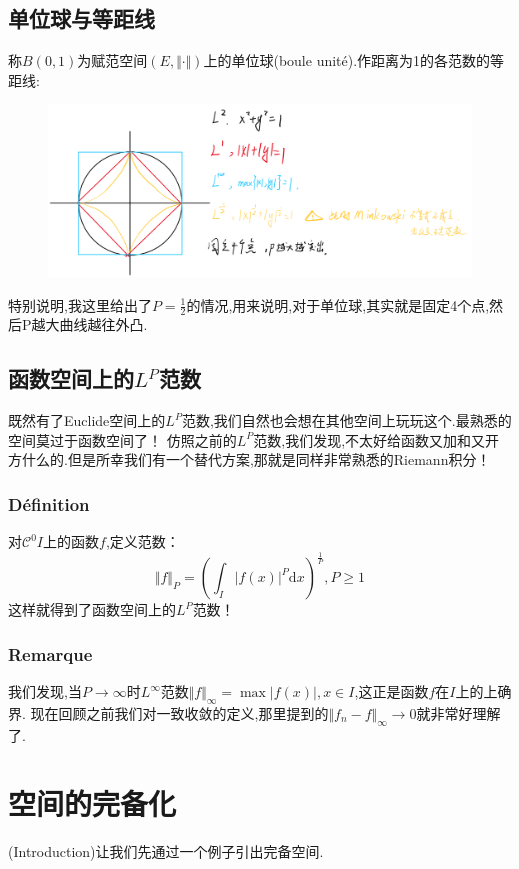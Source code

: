 \documentclass[12pt, a4paper, oneside]{ctexbook}
\newcommand{\C }{\mathcal{C}}%
\begin{document}
  \subsection{单位球与等距线}
  称$B(0,1)$为赋范空间$(E,\Vert \cdot \Vert)$上的单位球(boule unité).作距离为1的各范数的等距线:
  \begin{figure}[H]%
    \centering
    \includegraphics[scale=0.6]{danweiqiu.png}
    \label{fig:1}
  \end{figure}
  特别说明,我这里给出了$P=\frac{1}{2}$的情况,用来说明,对于单位球,其实就是固定4个点,然后P越大曲线越往外凸.
  \subsection{函数空间上的$L^P$范数}
  既然有了Euclide空间上的$L^P$范数,我们自然也会想在其他空间上玩玩这个.最熟悉的空间莫过于函数空间了！
  仿照之前的$L^P$范数,我们发现,不太好给函数又加和又开方什么的.但是所幸我们有一个替代方案,那就是同样非常熟悉的Riemann积分！
  \subsubsection{Définition}
  对$\C ^0I$上的函数$f$,定义范数：
  $$
  \Vert f \Vert_P=(\int_{I}|f(x)|^P \mathrm{d} x)^{\frac{1}{P}},P\ge1
  $$
  这样就得到了函数空间上的$L^P$范数！
  \subsubsection{Remarque}
  我们发现,当$P\rightarrow \infty$时$L^\infty$范数$\Vert f \Vert_\infty=\max|f(x)|,x\in I$,这正是函数$f$在$I$上的上确界.
  现在回顾之前我们对一致收敛的定义,那里提到的$\Vert f_n-f \Vert_\infty\rightarrow 0$就非常好理解了.
\section{空间的完备化}
  (Introduction)让我们先通过一个例子引出完备空间.
\end{document}

